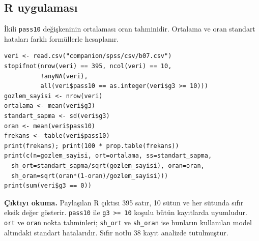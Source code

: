 \par\noindent\begin{minipage}{\linewidth}
\subsection{R uygulaması}
\label{sec:r-gercek-b07}

İkili \texttt{pass10} değişkeninin ortalaması oran tahminidir. Ortalama ve oran standart hataları farklı formüllerle hesaplanır.

\begin{lstlisting}[style=prismR]
veri <- read.csv("companion/spss/csv/b07.csv")
stopifnot(nrow(veri) == 395, ncol(veri) == 10,
          !anyNA(veri),
          all(veri$pass10 == as.integer(veri$g3 >= 10)))
gozlem_sayisi <- nrow(veri)
ortalama <- mean(veri$g3)
standart_sapma <- sd(veri$g3)
oran <- mean(veri$pass10)
frekans <- table(veri$pass10)
print(frekans); print(100 * prop.table(frekans))
print(c(n=gozlem_sayisi, ort=ortalama, ss=standart_sapma,
  sh_ort=standart_sapma/sqrt(gozlem_sayisi), oran=oran,
  sh_oran=sqrt(oran*(1-oran)/gozlem_sayisi)))
print(sum(veri$g3 == 0))
\end{lstlisting}

\textbf{Çıktıyı okuma.} Paylaşılan R çıktısı 395 satır, 10 sütun ve
her sütunda sıfır eksik değer gösterir. \texttt{pass10} ile
\texttt{g3 >= 10} koşulu bütün kayıtlarda uyumludur. \texttt{ort} ve
\texttt{oran} nokta tahminleri; \texttt{sh\_ort} ve \texttt{sh\_oran}
ise bunların kullanılan model altındaki standart hatalarıdır.
Sıfır notlu 38 kayıt analizde tutulmuştur.
\end{minipage}\par

